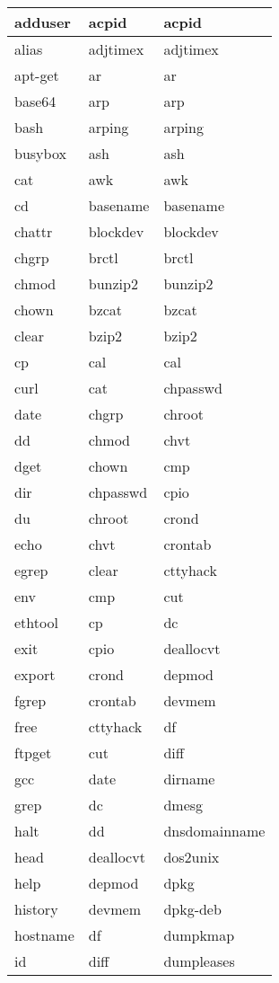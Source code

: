 \begin{longtable}{llp{64mm}}
adduser & acpid & acpid \\ \hline
alias & adjtimex & adjtimex \\ \hline
apt-get & ar & ar \\ \hline
base64 & arp & arp \\ \hline
bash & arping & arping \\ \hline
busybox & ash & ash \\ \hline
cat & awk & awk \\ \hline
cd & basename & basename \\ \hline
chattr & blockdev & blockdev \\ \hline
chgrp & brctl & brctl \\ \hline
chmod & bunzip2 & bunzip2 \\ \hline
chown & bzcat & bzcat \\ \hline
clear & bzip2 & bzip2 \\ \hline
cp & cal & cal \\ \hline
curl & cat & chpasswd \\ \hline
date & chgrp & chroot \\ \hline
dd & chmod & chvt \\ \hline
dget & chown & cmp \\ \hline
dir & chpasswd & cpio \\ \hline
du & chroot & crond \\ \hline
echo & chvt & crontab \\ \hline
egrep & clear & cttyhack \\ \hline
env & cmp & cut \\ \hline
ethtool & cp & dc \\ \hline
exit & cpio & deallocvt \\ \hline
export & crond & depmod \\ \hline
fgrep & crontab & devmem \\ \hline
free & cttyhack & df \\ \hline
ftpget & cut & diff \\ \hline
gcc & date & dirname \\ \hline
grep & dc & dmesg \\ \hline
halt & dd & dnsdomainname \\ \hline
head & deallocvt & dos2unix \\ \hline
help & depmod & dpkg \\ \hline
history & devmem & dpkg-deb \\ \hline
hostname & df & dumpkmap \\ \hline
id & diff & dumpleases \\ \hline

\end{longtable}

